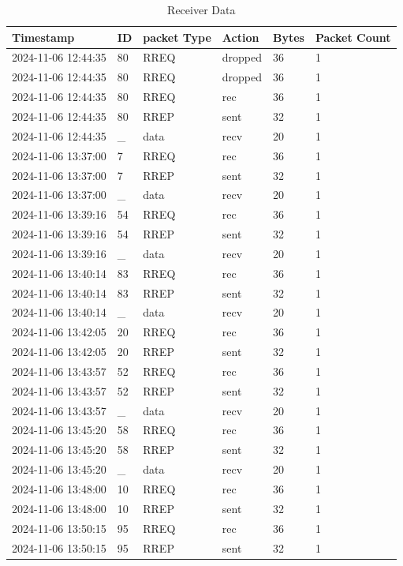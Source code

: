 \documentclass[]{nsm-thesis}
\begin{document}
\begin{longtable}{llllll}
\caption{Receiver Data} \label{tab:receiver} \\
\toprule
Timestamp & ID & packet Type & Action & Bytes & Packet Count \\
\midrule
2024-11-06 12:44:35 & 80 & RREQ & dropped & 36 & 1 \\
2024-11-06 12:44:35 & 80 & RREQ & dropped & 36 & 1 \\
2024-11-06 12:44:35 & 80 & RREQ & rec & 36 & 1 \\
2024-11-06 12:44:35 & 80 & RREP & sent & 32 & 1 \\
2024-11-06 12:44:35 & _ & data & recv & 20 & 1 \\
2024-11-06 13:37:00 & 7 & RREQ & rec & 36 & 1 \\
2024-11-06 13:37:00 & 7 & RREP & sent & 32 & 1 \\
2024-11-06 13:37:00 & _ & data & recv & 20 & 1 \\
2024-11-06 13:39:16 & 54 & RREQ & rec & 36 & 1 \\
2024-11-06 13:39:16 & 54 & RREP & sent & 32 & 1 \\
2024-11-06 13:39:16 & _ & data & recv & 20 & 1 \\
2024-11-06 13:40:14 & 83 & RREQ & rec & 36 & 1 \\
2024-11-06 13:40:14 & 83 & RREP & sent & 32 & 1 \\
2024-11-06 13:40:14 & _ & data & recv & 20 & 1 \\
2024-11-06 13:42:05 & 20 & RREQ & rec & 36 & 1 \\
2024-11-06 13:42:05 & 20 & RREP & sent & 32 & 1 \\
2024-11-06 13:43:57 & 52 & RREQ & rec & 36 & 1 \\
2024-11-06 13:43:57 & 52 & RREP & sent & 32 & 1 \\
2024-11-06 13:43:57 & _ & data & recv & 20 & 1 \\
2024-11-06 13:45:20 & 58 & RREQ & rec & 36 & 1 \\
2024-11-06 13:45:20 & 58 & RREP & sent & 32 & 1 \\
2024-11-06 13:45:20 & _ & data & recv & 20 & 1 \\
2024-11-06 13:48:00 & 10 & RREQ & rec & 36 & 1 \\
2024-11-06 13:48:00 & 10 & RREP & sent & 32 & 1 \\
2024-11-06 13:50:15 & 95 & RREQ & rec & 36 & 1 \\
2024-11-06 13:50:15 & 95 & RREP & sent & 32 & 1 \\

\end{longtable}
\end{document}
